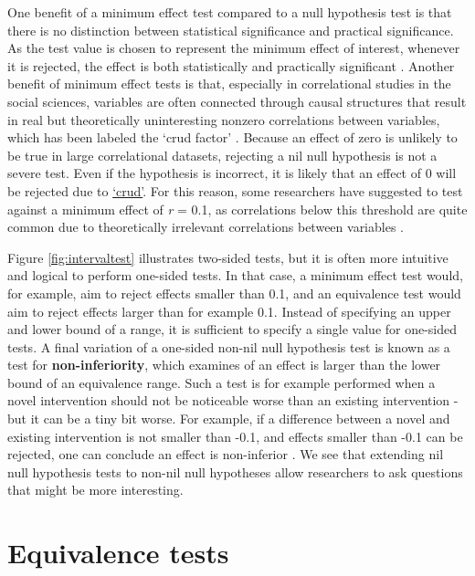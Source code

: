 \documentclass[
  oneside]{book}
\begin{document}
One benefit of a minimum effect test compared to a null hypothesis test is that there is no distinction between statistical significance and practical significance. As the test value is chosen to represent the minimum effect of interest, whenever it is rejected, the effect is both statistically and practically significant \citep{murphy_statistical_2014}. Another benefit of minimum effect tests is that, especially in correlational studies in the social sciences, variables are often connected through causal structures that result in real but theoretically uninteresting nonzero correlations between variables, which has been labeled the `crud factor' \citep{meehl_appraising_1990, orben_crud_2020}. Because an effect of zero is unlikely to be true in large correlational datasets, rejecting a nil null hypothesis is not a severe test. Even if the hypothesis is incorrect, it is likely that an effect of 0 will be rejected due to \protect\hyperlink{crud}{`crud'}. For this reason, some researchers have suggested to test against a minimum effect of \emph{r} = 0.1, as correlations below this threshold are quite common due to theoretically irrelevant correlations between variables \citep{ferguson_providing_2021}.

Figure \ref{fig:intervaltest} illustrates two-sided tests, but it is often more intuitive and logical to perform one-sided tests. In that case, a minimum effect test would, for example, aim to reject effects smaller than 0.1, and an equivalence test would aim to reject effects larger than for example 0.1. Instead of specifying an upper and lower bound of a range, it is sufficient to specify a single value for one-sided tests. A final variation of a one-sided non-nil null hypothesis test is known as a test for \textbf{non-inferiority}, which examines of an effect is larger than the lower bound of an equivalence range. Such a test is for example performed when a novel intervention should not be noticeable worse than an existing intervention - but it can be a tiny bit worse. For example, if a difference between a novel and existing intervention is not smaller than -0.1, and effects smaller than -0.1 can be rejected, one can conclude an effect is non-inferior \citep{schumi_through_2011, mazzolari_myths_2022}. We see that extending nil null hypothesis tests to non-nil null hypotheses allow researchers to ask questions that might be more interesting.

\hypertarget{equivalence-tests}{%
\section{Equivalence tests}\label{equivalence-tests}}
\end{document}
